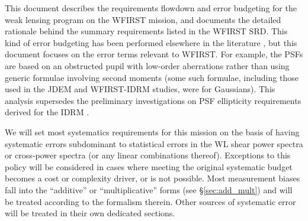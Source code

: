 
This document describes the requirements flowdown and error budgeting for the weak lensing program on the WFIRST mission, and documents the detailed rationale behind the summary requirements listed in the WFIRST SRD. This kind of error budgeting has been performed elsewhere in the literature \citep[e.g.][]{2008A&A...484...67P,2013MNRAS.429..661M}, but this document focuses on the error terms relevant to WFIRST. For example, the PSFs are based on an obstructed pupil with low-order aberrations rather than using generic formulae involving second moments (some such formulae, including those used in the JDEM and WFIRST-IDRM studies, were for Gaussians). This analysis supersedes the preliminary investigations on PSF ellipticity requirements derived for the IDRM \citep{2011arXiv1108.1374G}.

We will set most systematics requirements for this mission on the basis of having systematic errors subdominant to statistical errors in the WL shear power spectra or cross-power spectra (or any linear combinations thereof). Exceptions to this policy will be considered in cases where meeting the original systematic budget becomes a cost or complexity driver, or is not possible. Most measurement biases fall into the ``additive'' or ``multiplicative'' forms (see \S\ref{sec:add_mult}) and will be treated according to the formalism therein. Other sources of systematic error will be treated in their own dedicated sections.


